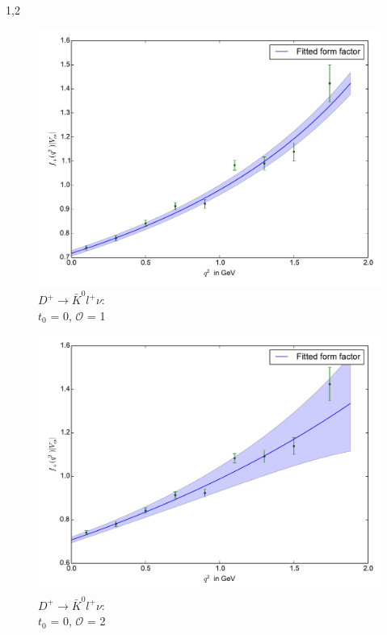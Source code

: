 \documentclass[11pt,a4paper,twoside,draft]{report}
\begin{document}
\begin{spacing}{1,2}
 \begin{minipage}[H]{0.45\textwidth}
 \begin{figure}[H]
 \includegraphics[width=1\textwidth]{Fit/D+-1Ord-0.pdf}
 \caption{$D^+\rightarrow \bar K^0 l^+ \nu$: \\$t_0$ = 0, $\mathcal{O}$ = 1}
 \label{pic_D+-1Ord-0}
 \end{figure}
 \end{minipage}
 \hfill
 \begin{minipage}[H]{0.45\textwidth}
 \begin{figure}[H]
 \includegraphics[width=1\textwidth]{Fit/D+-2Ord-0.pdf}
 \caption{$D^+\rightarrow \bar K^0 l^+ \nu$: \\$t_0$ = 0, $\mathcal{O}$ = 2}
 \label{pic_D+-2Ord-0}
 \end{figure}
 \end{minipage}
 

\end{spacing}
\end{document}
